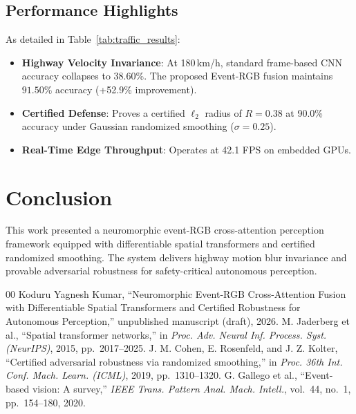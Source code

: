 \documentclass[journal,twocolumn,letterpaper]{IEEEtran}
\begin{document}
\subsection{Performance Highlights}
As detailed in Table~\ref{tab:traffic_results}:
\begin{itemize}
    \item \textbf{Highway Velocity Invariance}: At 180\,km/h, standard frame-based CNN accuracy collapses to 38.60\%. The proposed Event-RGB fusion maintains $\mathbf{91.50\%}$ accuracy (+52.9\% improvement).
    \item \textbf{Certified Defense}: Proves a certified $\ell_2$ radius of $R = 0.38$ at 90.0\% accuracy under Gaussian randomized smoothing ($\sigma = 0.25$).
    \item \textbf{Real-Time Edge Throughput}: Operates at 42.1 FPS on embedded GPUs.
\end{itemize}

\section{Conclusion}
This work presented a neuromorphic event-RGB cross-attention perception framework equipped with differentiable spatial transformers and certified randomized smoothing. The system delivers highway motion blur invariance and provable adversarial robustness for safety-critical autonomous perception.

\begin{thebibliography}{00}
 Koduru Yagnesh Kumar, ``Neuromorphic Event-RGB Cross-Attention Fusion with Differentiable Spatial Transformers and Certified Robustness for Autonomous Perception,'' unpublished manuscript (draft), 2026.
 M. Jaderberg et al., ``Spatial transformer networks,'' in \emph{Proc. Adv. Neural Inf. Process. Syst. (NeurIPS)}, 2015, pp.~2017--2025.
 J. M. Cohen, E. Rosenfeld, and J. Z. Kolter, ``Certified adversarial robustness via randomized smoothing,'' in \emph{Proc. 36th Int. Conf. Mach. Learn. (ICML)}, 2019, pp.~1310--1320.
 G. Gallego et al., ``Event-based vision: A survey,'' \emph{IEEE Trans. Pattern Anal. Mach. Intell.}, vol.~44, no.~1, pp.~154--180, 2020.
\end{thebibliography}
\end{document}
